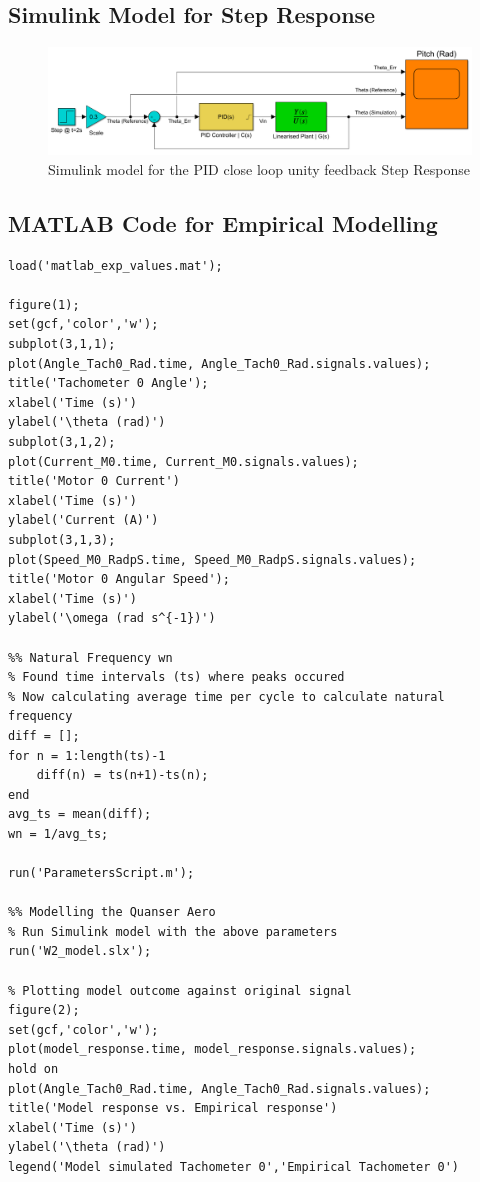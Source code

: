 \documentclass[11pt]{article}
\begin{document}
\subsection{Simulink Model for Step Response}\label{sim_step}
\begin{figure}[ht!]
    \centering
    \includegraphics[scale=0.5]{WS2_SimModel_B.PNG}   %
    \caption{Simulink model for the PID close loop unity feedback Step Response}
    \label{fig:sim_step}
\end{figure}

\subsection{MATLAB Code for Empirical Modelling}
\begin{lstlisting}[frame=single]
%% Plotting experimental data
load('matlab_exp_values.mat');

figure(1);
set(gcf,'color','w');
subplot(3,1,1);
plot(Angle_Tach0_Rad.time, Angle_Tach0_Rad.signals.values);
title('Tachometer 0 Angle');
xlabel('Time (s)')
ylabel('\theta (rad)')
subplot(3,1,2);
plot(Current_M0.time, Current_M0.signals.values);
title('Motor 0 Current')
xlabel('Time (s)')
ylabel('Current (A)')
subplot(3,1,3);
plot(Speed_M0_RadpS.time, Speed_M0_RadpS.signals.values);
title('Motor 0 Angular Speed');
xlabel('Time (s)')
ylabel('\omega (rad s^{-1})')

%% Natural Frequency wn
% Found time intervals (ts) where peaks occured
% Now calculating average time per cycle to calculate natural frequency
diff = [];
for n = 1:length(ts)-1
    diff(n) = ts(n+1)-ts(n);
end
avg_ts = mean(diff);
wn = 1/avg_ts;

run('ParametersScript.m');

%% Modelling the Quanser Aero
% Run Simulink model with the above parameters
run('W2_model.slx');

% Plotting model outcome against original signal
figure(2);
set(gcf,'color','w');
plot(model_response.time, model_response.signals.values);
hold on
plot(Angle_Tach0_Rad.time, Angle_Tach0_Rad.signals.values);
title('Model response vs. Empirical response')
xlabel('Time (s)')
ylabel('\theta (rad)')
legend('Model simulated Tachometer 0','Empirical Tachometer 0')
\end{lstlisting}
\end{document}
